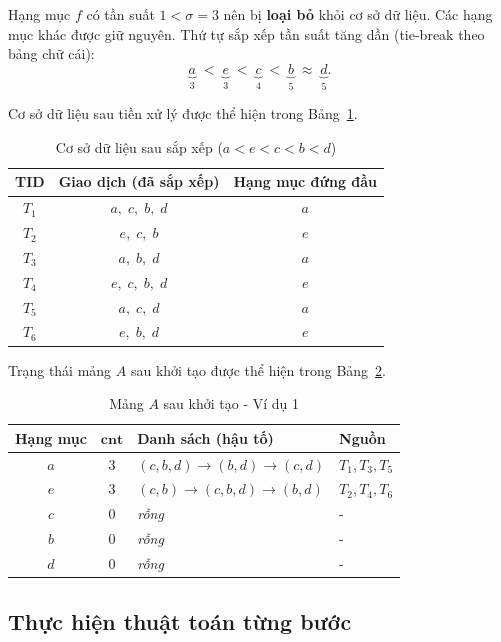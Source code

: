 \documentclass[12pt,a4paper]{report}
\begin{document}
Hạng mục $f$ có tần suất $1 < \sigma = 3$ nên bị \textbf{loại bỏ} khỏi cơ sở dữ liệu. Các hạng mục khác được giữ nguyên.
Thứ tự sắp xếp tần suất tăng dần (tie-break theo bảng chữ cái):
\[
  \underbrace{a}_{3} \;<\; \underbrace{e}_{3} \;<\; \underbrace{c}_{4} \;<\; \underbrace{b}_{5} \;\approx\; \underbrace{d}_{5}.
\]
 
Cơ sở dữ liệu sau tiền xử lý được thể hiện trong Bảng~\ref{tab:ex1-sorted}.
 
\begin{table}[H]
  \centering
  \caption{Cơ sở dữ liệu sau sắp xếp ($a < e < c < b < d$)}
  \label{tab:ex1-sorted}
  \begin{tabular}{ccc}
    \toprule
    \textbf{TID} & \textbf{Giao dịch (đã sắp xếp)} & \textbf{Hạng mục đứng đầu} \\
    \midrule
    $T_1$ & $a,\; c,\; b,\; d$ & $a$ \\
    $T_2$ & $e,\; c,\; b$       & $e$ \\
    $T_3$ & $a,\; b,\; d$       & $a$ \\
    $T_4$ & $e,\; c,\; b,\; d$  & $e$ \\
    $T_5$ & $a,\; c,\; d$       & $a$ \\
    $T_6$ & $e,\; b,\; d$       & $e$ \\
    \bottomrule
  \end{tabular}
\end{table}
 
Trạng thái mảng $A$ sau khởi tạo được thể hiện trong Bảng~\ref{tab:ex1-init}.
 
\begin{table}[H]
  \centering
  \caption{Mảng $A$ sau khởi tạo - Ví dụ 1}
  \label{tab:ex1-init}
  \begin{tabular}{cclp{5.5cm}}
    \toprule
    \textbf{Hạng mục} & $\mathbf{cnt}$ & \textbf{Danh sách (hậu tố)} & \textbf{Nguồn} \\
    \midrule
    $a$ & 3 & $(c,b,d) \to (b,d) \to (c,d)$ & $T_1, T_3, T_5$ \\
    $e$ & 3 & $(c,b) \to (c,b,d) \to (b,d)$ & $T_2, T_4, T_6$ \\
    $c$ & 0 & \textit{rỗng} & - \\
    $b$ & 0 & \textit{rỗng} & - \\
    $d$ & 0 & \textit{rỗng} & - \\
    \bottomrule
  \end{tabular}
\end{table}
 
\subsection{Thực hiện thuật toán từng bước}
 
\end{document}
